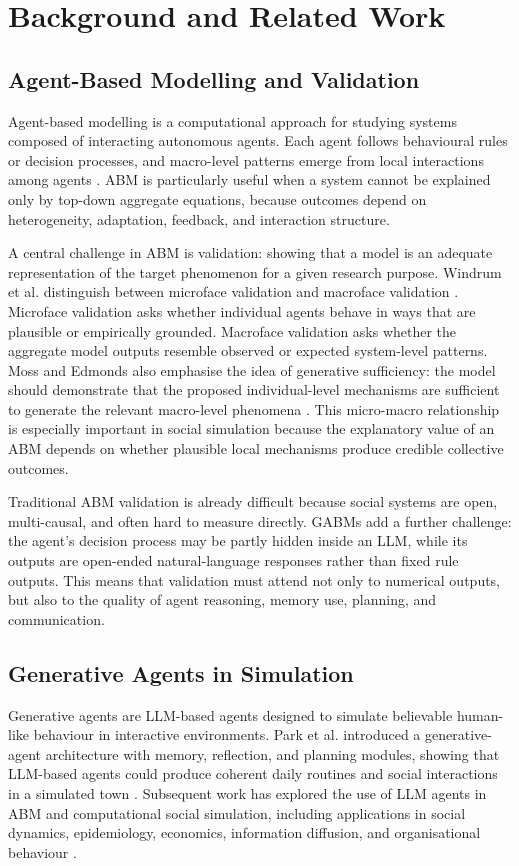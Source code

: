 \documentclass[11pt]{article}
\begin{document}
\section{Background and Related Work}

\subsection{Agent-Based Modelling and Validation}
Agent-based modelling is a computational approach for studying systems composed of interacting autonomous agents. Each agent follows behavioural rules or decision processes, and macro-level patterns emerge from local interactions among agents \cite{epstein1996growing}. ABM is particularly useful when a system cannot be explained only by top-down aggregate equations, because outcomes depend on heterogeneity, adaptation, feedback, and interaction structure.

A central challenge in ABM is validation: showing that a model is an adequate representation of the target phenomenon for a given research purpose. Windrum et al. distinguish between microface validation and macroface validation \cite{windrum2007empirical}. Microface validation asks whether individual agents behave in ways that are plausible or empirically grounded. Macroface validation asks whether the aggregate model outputs resemble observed or expected system-level patterns. Moss and Edmonds also emphasise the idea of generative sufficiency: the model should demonstrate that the proposed individual-level mechanisms are sufficient to generate the relevant macro-level phenomena \cite{moss2005towards}. This micro-macro relationship is especially important in social simulation because the explanatory value of an ABM depends on whether plausible local mechanisms produce credible collective outcomes.

Traditional ABM validation is already difficult because social systems are open, multi-causal, and often hard to measure directly. GABMs add a further challenge: the agent's decision process may be partly hidden inside an LLM, while its outputs are open-ended natural-language responses rather than fixed rule outputs. This means that validation must attend not only to numerical outputs, but also to the quality of agent reasoning, memory use, planning, and communication.

\subsection{Generative Agents in Simulation}
Generative agents are LLM-based agents designed to simulate believable human-like behaviour in interactive environments. Park et al. introduced a generative-agent architecture with memory, reflection, and planning modules, showing that LLM-based agents could produce coherent daily routines and social interactions in a simulated town \cite{park2023generative}. Subsequent work has explored the use of LLM agents in ABM and computational social simulation, including applications in social dynamics, epidemiology, economics, information diffusion, and organisational behaviour \cite{gao2024survey, ma2024computational, ghaffarzadegan2024tutorial}.
\end{document}
